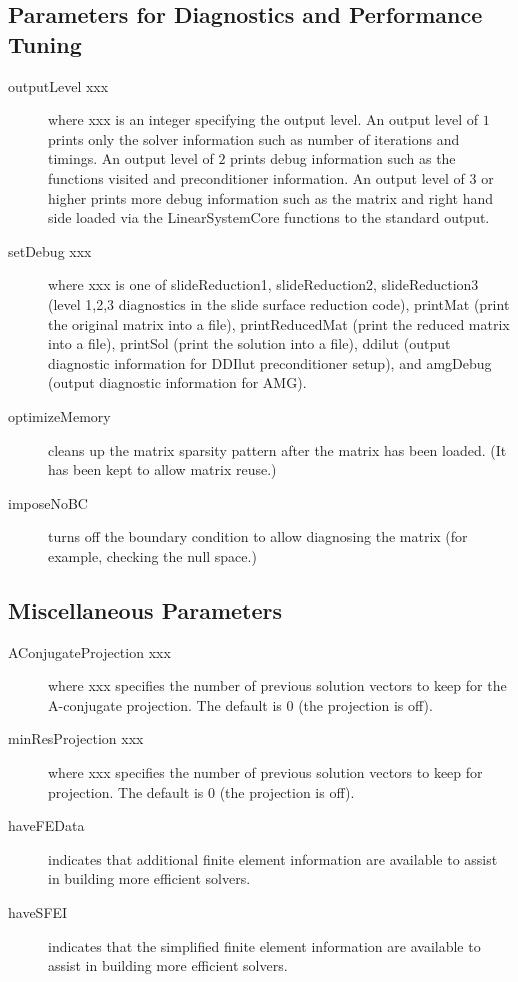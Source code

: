 \subsection{Parameters for Diagnostics and Performance Tuning}
\begin{description}
\item[outputLevel xxx] where xxx is an integer specifying the output
           level.  An output level of $1$ prints only the solver 
           information such as number of iterations and timings.
           An output level of $2$ prints debug information such as
           the functions visited and preconditioner information.
           An output level of $3$ or higher prints more debug information 
           such as the matrix and right hand side loaded via the 
           LinearSystemCore functions to the standard output.
\item[setDebug xxx] where xxx is one of {\sf slideReduction1}, 
           {\sf slideReduction2},
           {\sf slideReduction3} (level 1,2,3 diagnostics in the slide surface
           reduction code), {\sf printMat} (print the original matrix
           into a file), {\sf printReducedMat} (print the reduced matrix
           into a file),  {\sf printSol} (print the solution into a file), 
           {\sf ddilut} (output diagnostic information for DDIlut
           preconditioner setup), and {\sf amgDebug} (output diagnostic 
           information for AMG).
\item[optimizeMemory] cleans up the matrix sparsity pattern after the matrix
           has been loaded. (It has been kept to allow matrix reuse.)
\item[imposeNoBC] turns off the boundary condition to allow diagnosing the
           matrix (for example, checking the null space.)
\end{description}

\subsection{Miscellaneous Parameters}
\begin{description}
\item[AConjugateProjection xxx] where xxx specifies the number of previous
           solution vectors to keep for the A-conjugate projection. 
           The default is 0 (the projection is off).
\item[minResProjection xxx] where xxx specifies the number of previous
           solution vectors to keep for projection. 
           The default is 0 (the projection is off).
\item[haveFEData] indicates that additional finite element information are 
           available to assist in building more efficient solvers. 
\item[haveSFEI] indicates that the simplified finite element information are 
           available to assist in building more efficient solvers. 
\end{description}

